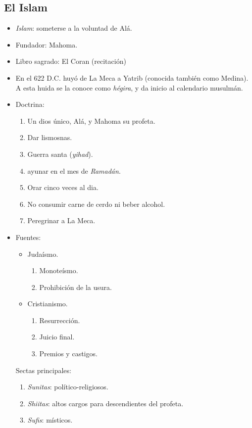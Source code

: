 \subsection{El Islam}

\begin{itemize}

\item \emph{Islam}: someterse a la voluntad de Alá.

\item Fundador: Mahoma.

\item Libro sagrado: El Coran (recitación)

\item En el 622 D.C. huyó de La Meca a Yatrib (conocida también como Medina). A esta huida se la conoce como \emph{hégira}, y da inicio al calendario musulmán.

\item Doctrina:
\begin{enumerate}
	\item Un dios único, Alá, y Mahoma su profeta.
	\item Dar lismosnas.
	\item Guerra santa (\emph{yihad}).
	\item ayunar en el mes de \emph{Ramadán}.
	\item Orar cinco veces al dia.
	\item No consumir carne de cerdo ni beber alcohol.
	\item Peregrinar a La Meca.
\end{enumerate}

\item Fuentes:
\begin{itemize}
	\item Judaísmo.
	\begin{enumerate}
	\item Monoteísmo.
	\item Prohibición de la usura.
	\end{enumerate}
	\item Cristianismo.
	\begin{enumerate}
		\item Resurrección.
		\item Juicio final.
		\item Premios y castigos.
	\end{enumerate}
\end{itemize}

Sectas principales:
\begin{enumerate}
	\item \emph{Sunitas}: político-religiosos.
	\item \emph{Shiitas}: altos cargos para descendientes del profeta.
	\item \emph{Sufis}: místicos.
\end{enumerate}


\end{itemize}
